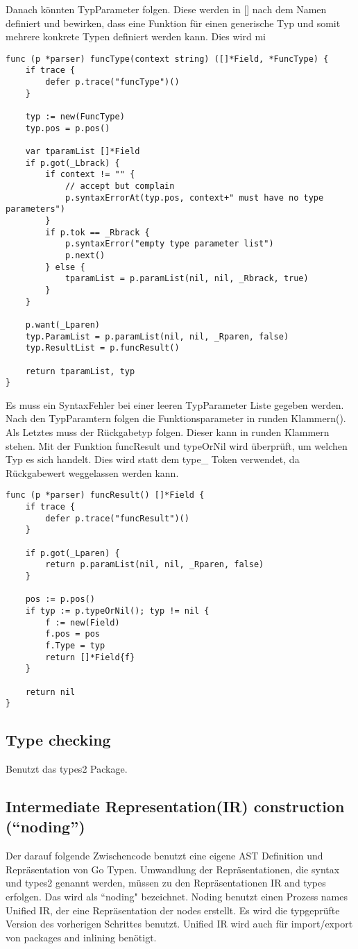 Danach könnten TypParameter folgen. Diese werden in [] nach dem Namen definiert und bewirken, dass eine Funktion für einen generische Typ und somit mehrere konkrete Typen definiert werden kann. Dies wird mi

\begin{lstlisting}
func (p *parser) funcType(context string) ([]*Field, *FuncType) {
	if trace {
		defer p.trace("funcType")()
	}

	typ := new(FuncType)
	typ.pos = p.pos()

	var tparamList []*Field
	if p.got(_Lbrack) {
		if context != "" {
			// accept but complain
			p.syntaxErrorAt(typ.pos, context+" must have no type parameters")
		}
		if p.tok == _Rbrack {
			p.syntaxError("empty type parameter list")
			p.next()
		} else {
			tparamList = p.paramList(nil, nil, _Rbrack, true)
		}
	}

	p.want(_Lparen)
	typ.ParamList = p.paramList(nil, nil, _Rparen, false)
	typ.ResultList = p.funcResult()

	return tparamList, typ
}
\end{lstlisting}
Es muss ein SyntaxFehler bei einer leeren TypParameter Liste gegeben werden. Nach den TypParamtern folgen die Funktionsparameter in runden Klammern().  Als Letztes muss der Rückgabetyp folgen. Dieser kann in runden Klammern stehen. Mit der Funktion funcResult und typeOrNil wird überprüft, um welchen Typ es sich handelt. Dies wird statt dem type\_ Token verwendet, da Rückgabewert weggelassen werden kann. 

\begin{lstlisting}
func (p *parser) funcResult() []*Field {
	if trace {
		defer p.trace("funcResult")()
	}

	if p.got(_Lparen) {
		return p.paramList(nil, nil, _Rparen, false)
	}

	pos := p.pos()
	if typ := p.typeOrNil(); typ != nil {
		f := new(Field)
		f.pos = pos
		f.Type = typ
		return []*Field{f}
	}

	return nil
}

\end{lstlisting}

\subsection{Type checking}
Benutzt das types2 Package.
\subsection{Intermediate Representation(IR) construction (“noding”)}
Der darauf folgende Zwischencode benutzt eine eigene AST Definition und Repräsentation von Go Typen. Umwandlung der Repräsentationen, die  syntax und types2 genannt werden, müssen zu den Repräsentationen IR and types erfolgen. Das wird als “noding" bezeichnet.
Noding benutzt einen Prozess names Unified IR, der eine Repräsentation der nodes erstellt. Es wird die typgeprüfte Version des vorherigen Schrittes benutzt. Unified IR wird auch für import/export von packages and inlining benötigt.
